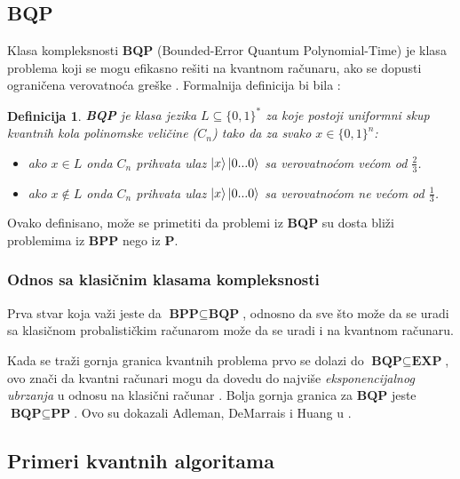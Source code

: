 \documentclass[12pt, letterpaper, oneside]{article}
\newtheorem{definition}{Definicija}
\begin{document}
\subsection{BQP}
Klasa kompleksnosti \textbf{BQP} (Bounded-Error Quantum Polynomial-Time) je klasa problema koji se mogu efikasno rešiti na kvantnom računaru, ako se dopusti ograničena verovatnoća greške \cite{nielsen_chuang_10th}.
Formalnija definicija bi bila \cite{aaronson2013quantum}:
\begin{definition}
    \textbf{BQP} je klasa jezika $L \subseteq \{0,1\}^{*}$ za koje postoji uniformni skup kvantnih kola polinomske veličine ($C_n$)
    tako da za svako $x \in \{0,1\}^{n}$:
    \begin{itemize}
        \item ako $x \in L$ onda $C_n$ prihvata ulaz $\Ket{x}\Ket{0...0}$ sa verovatnoćom većom od $\frac{2}{3}$.
        \item ako $x \notin L$ onda $C_n$ prihvata ulaz $\Ket{x}\Ket{0...0}$ sa verovatnoćom ne većom od $\frac{1}{3}$.
    \end{itemize} 
\end{definition}
Ovako definisano, može se primetiti da problemi iz \textbf{BQP} su dosta bliži problemima iz \textbf{BPP} nego iz \textbf{P}.
\subsubsection*{Odnos sa klasičnim klasama kompleksnosti}
Prva stvar koja važi jeste da $\textbf{BPP} \subseteq \textbf{BQP}$, odnosno da sve što može da se uradi sa klasičnom probalističkim računarom može da 
se uradi i na kvantnom računaru.

Kada se traži gornja granica kvantnih problema prvo se dolazi do $\textbf{BQP} \subseteq \textbf{EXP}$, ovo znači da kvantni računari mogu da dovedu
do najviše \textit{eksponencijalnog ubrzanja} u odnosu na klasični računar \cite{aaronson2013quantum}.
Bolja gornja granica za $\textbf{BQP}$ jeste $\textbf{BQP} \subseteq \textbf{PP}$. Ovo su dokazali Adleman, DeMarrais i Huang u \cite{adleman1997quantum}.
\subsection{Primeri kvantnih algoritama}
\end{document}
